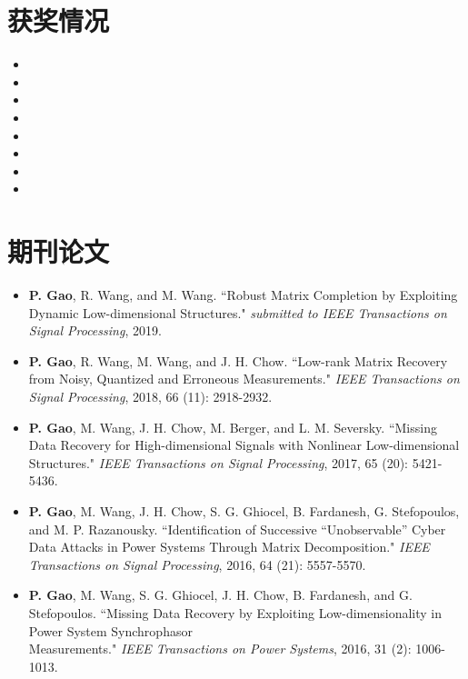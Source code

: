 \documentclass{resume}
\begin{document}
\section{获奖情况}
\begin{itemize}[parsep=0.2ex]
\item {}
\item {}
\item {}
\item {}
\item {}
\item {}
\item {}
\item {}
\end{itemize}


\section{期刊论文}
\begin{itemize}[parsep=0.2ex]
\item {{\bf P. Gao}, R. Wang, and M. Wang. ``Robust Matrix Completion by Exploiting Dynamic Low-dimensional Structures." \emph{submitted to IEEE Transactions on Signal Processing}, 2019.}

\item {{\bf P. Gao}, R. Wang, M. Wang, and J. H. Chow. ``Low-rank Matrix Recovery from Noisy, Quantized and Erroneous Measurements." \emph{IEEE Transactions on Signal Processing}, 2018, 66 (11): 2918-2932.}

\item {{\bf P. Gao}, M. Wang, J. H. Chow, M. Berger, and L. M. Seversky. ``Missing Data Recovery for High-dimensional Signals with Nonlinear Low-dimensional Structures." \emph{IEEE Transactions on Signal Processing}, 2017, 65 (20): 5421-5436.}

\item {{\bf P. Gao}, M. Wang, J. H. Chow, S. G. Ghiocel, B. Fardanesh, G. Stefopoulos, and M. P. Razanousky. ``Identification of Successive ``Unobservable'' Cyber Data Attacks in Power Systems Through Matrix Decomposition." \emph{IEEE Transactions on Signal Processing}, 2016, 64 (21): 5557-5570.}

\item {{\bf P. Gao}, M. Wang, S. G. Ghiocel, J. H. Chow, B. Fardanesh, and G. Stefopoulos. ``Missing Data Recovery by Exploiting Low-dimensionality in Power System Synchrophasor \\ Measurements." \emph{IEEE Transactions on Power Systems}, 2016, 31 (2): 1006-1013.}
\end{itemize}
\end{document}
